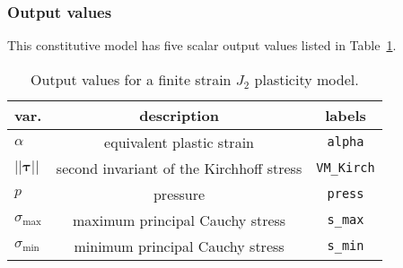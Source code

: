 \subsubsection{Output values}
This constitutive model has five scalar output values listed in
Table~\ref{tab.mat.J2.QL.LinearHardening.output}.
\begin{table}[h]
\caption{\label{tab.mat.J2.QL.LinearHardening.output} Output values 
for a finite strain $J_2$ plasticity model.}
\begin{center}
\begin{tabular}[c]{|l|c|c|}
\hline
 \parbox[c]{0.75in}{\centering \textbf{var.}}
&\parbox[c]{3.0in}{\raggedright \textbf{description}}
&\parbox[c]{1.0in}{\raggedright  \textbf{labels}}\\
\hline
\parbox[c]{0.75in}{\centering $\alpha$} & 
\parbox[c]{3.0in}{\raggedright equivalent plastic strain} &
\parbox[c]{1.0in}{\raggedright \texttt{alpha}}\\
\hline
\parbox[c]{0.75in}{\centering $||\boldsymbol{\tau}||$}  & 
\parbox[c]{3.0in}{\raggedright second invariant of the Kirchhoff stress} &
\parbox[c]{1.0in}{\raggedright \texttt{VM\_Kirch}}\\
\hline
\parbox[c]{0.75in}{\centering $p$}  & 
\parbox[c]{3.0in}{\raggedright pressure} &
\parbox[c]{1.0in}{\raggedright \texttt{press}}\\
\hline
\parbox[c]{0.75in}{\centering $\sigma_{\textrm{max}}$}  & 
\parbox[c]{3.0in}{\raggedright maximum principal Cauchy stress} &
\parbox[c]{1.0in}{\raggedright \texttt{s\_max}}\\
\hline
\parbox[c]{0.75in}{\centering $\sigma_{\textrm{min}}$}  & 
\parbox[c]{3.0in}{\raggedright minimum principal Cauchy stress} &
\parbox[c]{1.0in}{\raggedright \texttt{s\_min}}\\
\hline
\end{tabular}
\end{center}
\end{table}


